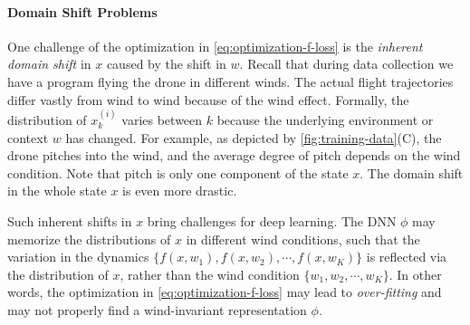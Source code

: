 \paragraph{Domain Shift Problems} One challenge of the optimization in \cref{eq:optimization-f-loss} is the \emph{inherent domain shift} in $x$ caused by the shift in $w$. Recall that during data collection we have a program flying the drone in different winds. The actual flight trajectories differ vastly from wind to wind because of the wind effect.
Formally, the distribution of $x_k^{(i)}$ varies between $k$ because the underlying environment or context $w$ has changed. For example, as depicted by \cref{fig:training-data}(C), the drone pitches into the wind, and the average degree of pitch depends on the wind condition. Note that pitch is only one component of the state $x$. The domain shift in the whole state $x$ is even more drastic.

Such inherent shifts in $x$ bring challenges for deep learning. The DNN $\phi$ may memorize the distributions of $x$ in different wind conditions, such that the variation in the dynamics $\{ f(x,w_1), f(x,w_2), \cdots, f(x,w_K)\}$ is reflected via the distribution of $x$, rather than the wind condition $\{w_1, w_2, \cdots, w_K\}$. In other words, the optimization in \cref{eq:optimization-f-loss} may lead to \emph{over-fitting} and may not properly find a wind-invariant representation $\phi$.

